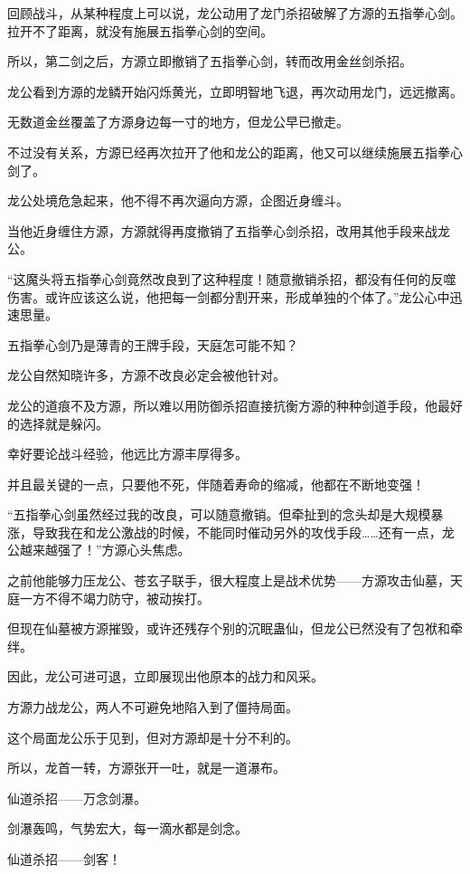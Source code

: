 \begin{this_body}
回顾战斗，从某种程度上可以说，龙公动用了龙门杀招破解了方源的五指拳心剑。拉开不了距离，就没有施展五指拳心剑的空间。

所以，第二剑之后，方源立即撤销了五指拳心剑，转而改用金丝剑杀招。

龙公看到方源的龙鳞开始闪烁黄光，立即明智地飞退，再次动用龙门，远远撤离。

无数道金丝覆盖了方源身边每一寸的地方，但龙公早已撤走。

不过没有关系，方源已经再次拉开了他和龙公的距离，他又可以继续施展五指拳心剑了。

龙公处境危急起来，他不得不再次逼向方源，企图近身缠斗。

当他近身缠住方源，方源就得再度撤销了五指拳心剑杀招，改用其他手段来战龙公。

“这魔头将五指拳心剑竟然改良到了这种程度！随意撤销杀招，都没有任何的反噬伤害。或许应该这么说，他把每一剑都分割开来，形成单独的个体了。”龙公心中迅速思量。

五指拳心剑乃是薄青的王牌手段，天庭怎可能不知？

龙公自然知晓许多，方源不改良必定会被他针对。

龙公的道痕不及方源，所以难以用防御杀招直接抗衡方源的种种剑道手段，他最好的选择就是躲闪。

幸好要论战斗经验，他远比方源丰厚得多。

并且最关键的一点，只要他不死，伴随着寿命的缩减，他都在不断地变强！

“五指拳心剑虽然经过我的改良，可以随意撤销。但牵扯到的念头却是大规模暴涨，导致我在和龙公激战的时候，不能同时催动另外的攻伐手段……还有一点，龙公越来越强了！”方源心头焦虑。

之前他能够力压龙公、苍玄子联手，很大程度上是战术优势——方源攻击仙墓，天庭一方不得不竭力防守，被动挨打。

但现在仙墓被方源摧毁，或许还残存个别的沉眠蛊仙，但龙公已然没有了包袱和牵绊。

因此，龙公可进可退，立即展现出他原本的战力和风采。

方源力战龙公，两人不可避免地陷入到了僵持局面。

这个局面龙公乐于见到，但对方源却是十分不利的。

所以，龙首一转，方源张开一吐，就是一道瀑布。

仙道杀招——万念剑瀑。

剑瀑轰鸣，气势宏大，每一滴水都是剑念。

仙道杀招——剑客！


\end{this_body}
